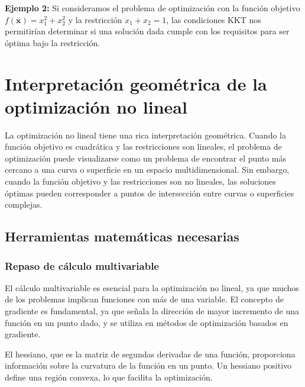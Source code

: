 \begin{flushleft}
	\textbf{Ejemplo 2:} Si consideramos el problema de optimización con la función objetivo $f(\mathbf{x})=x_{1}^{2}+x_{2}^{2}$ y la restricción $x_{1}+x_{2}=1$, las condiciones KKT nos permitirían determinar si una solución dada cumple con los requisitos para ser óptima bajo la restricción.
\end{flushleft}

\section{Interpretación geométrica de la optimización no lineal}

\begin{flushleft}
	La optimización no lineal tiene una rica interpretación geométrica. Cuando la función objetivo es cuadrática y las restricciones son lineales, el problema de optimización puede visualizarse como un problema de encontrar el punto más cercano a una curva o superficie en un espacio multidimensional. Sin embargo, cuando la función objetivo y las restricciones son no lineales, las soluciones óptimas pueden corresponder a puntos de intersección entre curvas o superficies complejas.
\end{flushleft}

\subsection{Herramientas matemáticas necesarias}

\subsubsection{Repaso de cálculo multivariable}

\begin{flushleft}
	El cálculo multivariable es esencial para la optimización no lineal, ya que muchos de los problemas implican funciones con más de una variable. El concepto de gradiente es fundamental, ya que señala la dirección de mayor incremento de una función en un punto dado, y se utiliza en métodos de optimización basados en gradiente.
\end{flushleft}

\begin{flushleft}
	El hessiano, que es la matriz de segundas derivadas de una función, proporciona información sobre la curvatura de la función en un punto. Un hessiano positivo define una región convexa, lo que facilita la optimización.
\end{flushleft}

